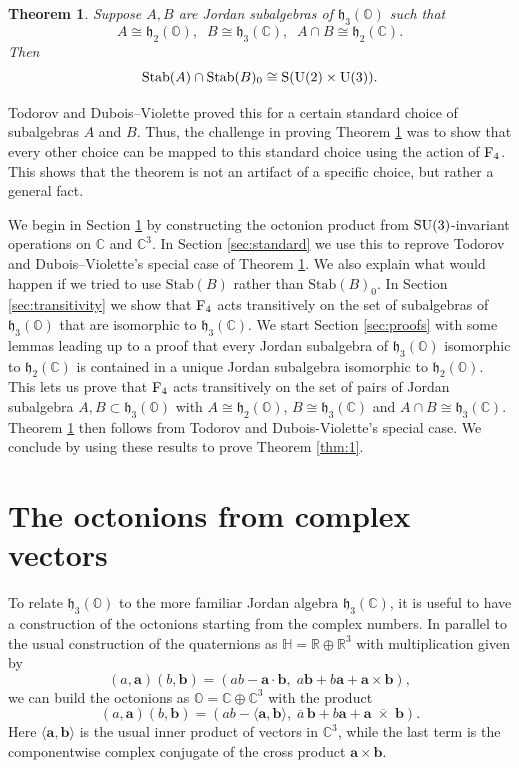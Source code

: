 \documentclass{article}
\theoremstyle{plain}
\newtheorem{thm}{Theorem}
\theoremstyle{remark}
\theoremstyle{definition}
\newcommand{\R}{{\mathbb R}}  %
\newcommand{\C}{{\mathbb C}}  %
\renewcommand{\H}{{\mathbb H}}  %
\renewcommand{\O}{{\mathbb O}}  %
\newcommand{\U}{{\rm U}}    %
\newcommand{\SU}{{\rm SU}}    %
\newcommand{\F}{{\rm F}}       %
\newcommand{\Stab}{\mathrm{Stab}} %
\renewcommand{\S}{\mathrm{S}} %
\newcommand{\h}{\mathfrak{h}}  %
\begin{document}
\begin{thm}
\label{thm:2}
Suppose $A,B$ are Jordan subalgebras of $\h_3(\O)$ such that
\[  A \cong \h_2(\O), \;\; B \cong \h_3(\C), \;\; A \cap B \cong \h_2(\C) . \]
Then 
\[     \Stab(A) \cap \Stab(B)_0 \cong \S(\U(2) \times \U(3)) .\]
\end{thm}

Todorov and Dubois--Violette proved this for a certain standard choice of subalgebras $A$ and $B$.  Thus, the challenge in proving Theorem \ref{thm:2} was to show that every other choice can be mapped to this standard choice using the action of $\F_4$.  This shows that the theorem is not an artifact of a specific choice, but rather a general fact.

We begin in Section \ref{sec:octonions} by constructing the octonion product from $\SU(3)$-invariant operations on $\C$ and $\C^3$.  In Section \ref{sec:standard} we use this to reprove Todorov and Dubois--Violette's special case of Theorem \ref{thm:2}.  We also explain what would happen if we tried to use $\Stab(B)$ rather than $\Stab(B)_0$.  In Section \ref{sec:transitivity} we show that $\F_4$ acts transitively on the set of subalgebras of $\h_3(\O)$ that are isomorphic to $\h_3(\C)$.  We start Section \ref{sec:proofs} with some lemmas leading up to a proof that every Jordan subalgebra of $\h_3(\O)$ isomorphic to $\h_2(\C)$ is contained in a unique Jordan subalgebra isomorphic to $\h_2(\O)$.   This lets us prove that $\F_4$ acts transitively on the set of pairs of Jordan subalgebra $A, B \subset \h_3(\O)$ with $A \cong \h_2(\O)$, $B \cong \h_3(\C)$ and $A \cap B \cong \h_3(\C)$.  Theorem \ref{thm:2} then follows from Todorov and Dubois-Violette's special case.  We conclude by using these results to prove Theorem \ref{thm:1}.  

\section{The octonions from complex vectors}
\label{sec:octonions}

To relate $\h_3(\O)$ to the more familiar Jordan algebra $\h_3(\C)$, it is useful to have a construction of the octonions starting from the complex numbers.  In parallel to the usual construction of the quaternions as $\H =  \R \oplus \R^3$
with multiplication given by 
\[ (a, \mathbf{a})(b ,\mathbf{b}) = (a b - \mathbf{a} \cdot \mathbf{b}, \; a \mathbf{b} + b \mathbf{a} + \mathbf{a} \times \mathbf{b}), \]
we can build the octonions as $\O = \C \oplus \C^3$ with the product
\[ (a, \mathbf{a})(b, \mathbf{b}) = (a b - \langle \mathbf{a}, \mathbf{b}\rangle, \; \overline{a}\, \mathbf{b} + b \mathbf{a} + \mathbf{a} \; \overline{\!\times\!} \;\mathbf{b}) .\]
Here $\langle \mathbf{a}, \mathbf{b}\rangle$ is the usual inner product of vectors in $\C^3$, while the last term is the componentwise complex conjugate of the cross product $\mathbf{a} \times \mathbf{b}$.  
\end{document}

